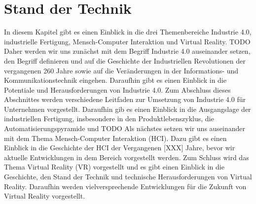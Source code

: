 \chapter{Stand der Technik}\label{cha:StandDerTechnik}

In diesem Kapitel gibt es einen Einblick in die drei Themenbereiche Industrie 4.0, industrielle Fertigung, Mensch-Computer Interaktion und Virtual Reality.  TODO
\newline\newline
Daher werden wir uns zunächst mit dem Begriff Industrie 4.0 auseinander setzen, den Begriff definieren und auf die Geschichte der Industriellen Revolutionen der vergangenen 260 Jahre sowie auf die Veränderungen in der Informations- und Kommunikationstechnik eingehen. Daraufhin gibt es einen Einblick in die Potentiale und Herausforderungen von Industrie 4.0. Zum Abschluss dieses Abschnittes werden verschiedene Leitfaden zur Umsetzung von Industrie 4.0 für Unternehmen vorgestellt.
\newline\newline
Daraufhin gib es einen Einblick in die Ausgangslage der industriellen Fertigung, insbesondere in den Produktlebenszyklus, die Automatisierungspyramide und TODO
\newline\newline
Als nächstes setzen wir uns auseinander mit dem Thema Mensch-Computer Interaktion (HCI). Dazu gibt es einen Einblick in die Geschichte der HCI der Vergangenen [XXX] Jahre, bevor wir aktuelle Entwicklungen in dem Bereich vorgestellt werden.
\newline\newline
Zum Schluss wird das Thema Virtual Reality (VR) vorgestellt und es gibt einen Einblick in die Geschichte, den Stand der Technik und technische Herausforderungen von Virtual Reality. Daraufhin werden vielversprechende Entwicklungen für die Zukunft von Virtual Reality vorgestellt.


